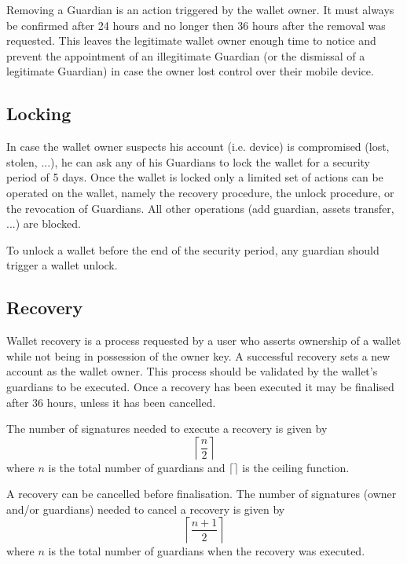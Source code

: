 \documentclass[12pt]{article}
\begin{document}
Removing a Guardian is an action triggered by the wallet owner. It must always be confirmed after 24 hours and no longer then 36 hours after the removal was requested. This leaves the legitimate wallet owner enough time to notice and prevent the appointment of an illegitimate Guardian (or the dismissal of a legitimate Guardian) in case the owner lost control over their mobile device.

\subsection{Locking}

In case the wallet owner suspects his account (i.e. device) is compromised (lost, stolen, ...), he can ask any of his Guardians to lock the wallet for a security period of 5 days. Once the wallet is locked only a limited set of actions can be operated on the wallet, namely the recovery procedure, the unlock procedure, or the revocation of Guardians. All other operations (add guardian, assets transfer, ...) are blocked.

To unlock a wallet before the end of the security period, any guardian should trigger a wallet unlock.

\subsection{Recovery}

Wallet recovery is a process requested by a user who asserts ownership of a wallet while not being in possession of the owner key. A successful recovery sets a new account as the wallet owner. This process should be validated by the wallet's guardians to be executed. Once a recovery has been executed it may be finalised after 36 hours, unless it has been cancelled.

The number of signatures needed to execute a recovery is given by
\begin{equation*}
    \left\lceil {\frac{n}{2}} \right\rceil
\end{equation*}
where $n$ is the total number of guardians and $\lceil\rceil$ is the ceiling function.

A recovery can be cancelled before finalisation. The number of signatures (owner and/or guardians) needed to cancel a recovery is given by
\begin{equation*}
    \left\lceil {\frac{n+1}{2}} \right\rceil
\end{equation*}
where $n$ is the total number of guardians when the recovery was executed.
\end{document}
